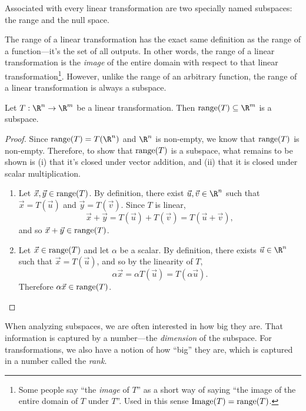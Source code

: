 
Associated with every linear transformation
are two specially named subspaces: the range and the null space. 


The range of a linear transformation has the exact same definition as the range of a function---it's the set of all outputs.
In other words, the range of a linear transformation is the \emph{image} of the entire domain with respect to that linear
transformation\footnote{ Some people say ``the \emph{image} of $T$'' as a short way of saying ``the image
of the entire domain of $T$ under $T$''. Used in this sense $\text{Image}(T)=\operatorname{range}(T)$.}. However, unlike the range of an arbitrary function, the range of a linear transformation
is always a subspace.

\begin{theorem}
	Let $T:\R^n\to\R^m$ be a linear transformation. Then $\Range(T)\subseteq \R^m$ is a 
	subspace.
\end{theorem}
\begin{proof}
	Since $\Range(T)=T(\R^n)$ and $\R^n$ is non-empty, we know that $\operatorname{range}(T)$ is non-empty.
	Therefore, to show that $\operatorname{range}(T)$ is a subspace, what remains to be shown is (i) that it's closed under vector addition,
	and (ii) that it is closed under scalar multiplication.
	\begin{enumerate}[label=(\roman*)]
		\item Let $\vec x,\vec y\in\operatorname{range}(T)$.
			By definition, there exist $\vec u,\vec v\in\R^n$ such that $\vec x=T(\vec u)$
			and $\vec y=T(\vec v)$. Since $T$ is linear,
			\[
				\vec x+\vec y=T(\vec u)+T(\vec v)=T(\vec u+\vec v),
			\]
			and so $\vec x+\vec y\in\operatorname{range}(T)$.
		\item Let $\vec x\in\operatorname{range}(T)$ and let $\alpha$ be a scalar.
			By definition, there exists $\vec u\in\R^n$ such that $\vec x=T(\vec u)$,
			and so by the linearity of $T$,
			\[
			\alpha\vec x=\alpha T(\vec u)=T(\alpha\vec u).
			\]
			Therefore $\alpha\vec x\in\operatorname{range}(T)$.
	\end{enumerate}
\end{proof}

When analyzing subspaces, we are often interested in how big they are. That information is captured by a number---the
\emph{dimension} of the subspace. For transformations, we also have a notion of how ``big'' they are, which is captured
in a number called the \emph{rank}.


